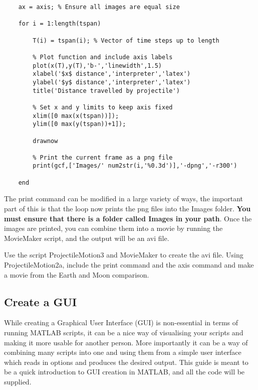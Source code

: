 \documentclass[12pt]{report}
\begin{document}
\begin{lstlisting}
    ax = axis; % Ensure all images are equal size
    
    for i = 1:length(tspan)
    
        T(i) = tspan(i); % Vector of time steps up to length
        
        % Plot function and include axis labels
        plot(x(T),y(T),'b-','linewidth',1.5)
        xlabel('$x$ distance','interpreter','latex')
        ylabel('$y$ distance','interpreter','latex')
        title('Distance travelled by projectile')
        
        % Set x and y limits to keep axis fixed
        xlim([0 max(x(tspan))]);
        ylim([0 max(y(tspan))+1]);
        
        drawnow
        
        % Print the current frame as a png file
        print(gcf,['Images/' num2str(i,'%0.3d')],'-dpng','-r300') 
        
    end
\end{lstlisting}

\noindent The print command can be modified in a large variety of ways, the important part of this is that the loop now prints the png files into the Images folder. \textbf{You must ensure that there is a folder called Images in your path}. Once the images are printed, you can combine them into a movie by running the MovieMaker script, and the output will be an avi file.\\

\begin{tcolorbox}[title=Task (Optional)]
Use the script ProjectileMotion3 and MovieMaker to create the avi file. Using ProjectileMotion2a, include the print command and the axis command and make a movie from the Earth and Moon comparison.
\end{tcolorbox}

\subsection*{Create a GUI}
While creating a Graphical User Interface (GUI) is non-essential in terms of running MATLAB scripts, it can be a nice way of visualising your scripts and making it more usable for another person. More importantly it can be a way of combining many scripts into one and using them from a simple user interface which reads in options and produces the desired output. This guide is meant to be a quick introduction to GUI creation in MATLAB, and all the code will be supplied.\\
\end{document}
